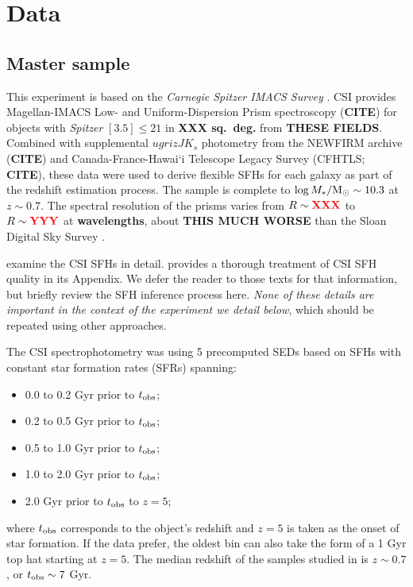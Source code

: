 \documentclass[a4paper,fleqn,usenatbib]{mnras}
\newcommand{\Msun}{{\rm M}_\odot}
\newcommand{\Mstel}{M_\ast}
\newcommand{\logM}{\log\Mstel/\Msun}
\newcommand{\bfr}{\bf\color{red}}
\newcommand{\tobs}{t_{\rm obs}}
\newcommand{\bitem}{\begin{itemize}}
\newcommand{\eitem}{\end{itemize}}
\newcommand{\CITE}{{\bfr CITE}}
\begin{document}

\section{Data}
\label{sec:data}

\subsection{Master sample}
\label{sec:master}

This experiment is based on the {\it Carnegie Spitzer IMACS Survey} \citep[CSI;][]{Kelson14a}. CSI provides
Magellan-IMACS Low- and Uniform-Dispersion Prism spectroscopy (\CITE) for objects with {\it Spitzer} 
$[3.5]\leq21$ in {\bfr XXX sq.~deg.} from {\bfr THESE FIELDS}. Combined with supplemental 
$ugrizJK_{s}$ photometry from the NEWFIRM archive (\CITE) and Canada-France-Hawai`i Telescope 
Legacy Survey (CFHTLS; \CITE), these data were used to derive flexible SFHs for each galaxy as part of 
the redshift estimation process. The sample is complete to $\logM\sim10.3$ at $z\sim0.7$.
The spectral resolution of the prisms varies from $R\sim{\bfr XXX}$ to $R\sim{\bfr YYY}$ at
{\bfr wavelengths}, about {\bfr THIS MUCH WORSE} than the Sloan Digital Sky Survey \citep{York00}.

\citet{Dressler16, Dressler18} examine the CSI SFHs in detail. \citet{Dressler18} provides a thorough treatment 
of CSI SFH quality in its Appendix. We defer the reader to those texts for that information, but briefly review 
the SFH inference process here. {\it None of these details are important in the context of the experiment we 
detail below}, which should be repeated using other approaches.

The CSI spectrophotometry was using 5 precomputed SEDs based on SFHs with constant star formation 
rates (SFRs) spanning:
\bitem
	\item 0.0 to 0.2 Gyr prior to $\tobs$;
	\item 0.2 to 0.5 Gyr prior to $\tobs$;
	\item 0.5 to 1.0 Gyr prior to $\tobs$;
	\item 1.0 to 2.0 Gyr prior to $\tobs$;
	\item 2.0 Gyr prior to $\tobs$ to $z=5$;
\eitem
where $\tobs$ corresponds to the object's redshift and $z=5$ is taken as the onset of star formation. If 
the data prefer, the oldest bin can also take the form of a 1 Gyr top hat starting at $z=5$.
The median redshift of the samples studied in \citet{Dressler16, Dressler18} is $z\sim0.7$, or $\tobs\sim7$ Gyr.
\end{document}
